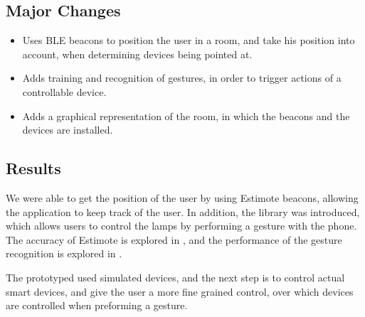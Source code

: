 \subsection{Major Changes}
\begin{itemize}
\item Uses BLE beacons to position the user in a room, and take his position into account, when determining devices being pointed at.
\item Adds training and recognition of gestures, in order to trigger actions of a controllable device.
\item Adds a graphical representation of the room, in which the beacons and the devices are installed.
\end{itemize}

\subsection{Results}

We were able to get the position of the user by using Estimote beacons, 
allowing the application to keep track of the user. 
In addition, the \threedollar library was introduced, 
which allows users to control the lamps by performing a gesture with the phone.
The accuracy of Estimote is explored in , 
and the performance of the gesture recognition is explored in .

The prototyped used simulated devices, 
and the next step is to control actual smart devices, 
and give the user a more fine grained control, 
over which devices are controlled when preforming a gesture.

